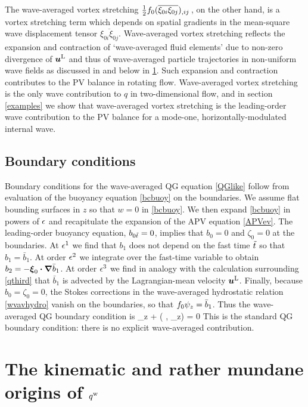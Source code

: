 \documentclass[12pt, oneside]{book}
\begin{document}
The wave-averaged vortex stretching $\half f_0  (\overline{\xi_{0i} \xi_{0j}}  )_{,ij} \, $, on the other hand, is a vortex stretching term which depends on spatial gradients in the mean-square wave displacement tensor $\overline{\xi_{0i} \xi_{0j} }$.  Wave-averaged vortex stretching reflects the expansion and contraction of `wave-averaged fluid elements' due to non-zero divergence of $\buL$ and thus of wave-averaged particle trajectories in non-uniform wave fields as discussed in \citet{McIntyre1988} and below in \ch \ref{waveAveragedKinematics}.  Such expansion and contraction contributes to the PV balance in rotating flow.  Wave-averaged vortex stretching is the only wave contribution to $q$ in two-dimensional flow, and in section \ref{examples} we show that wave-averaged vortex stretching is the leading-order wave contribution to the PV balance for a mode-one, horizontally-modulated internal wave.

\subsection{Boundary conditions}

Boundary conditions for the wave-averaged QG equation \eqref{QGlike} follow from evaluation of the buoyancy equation \eqref{bcbuoy} on the boundaries. We assume flat bounding surfaces in $z$ so that  $w=0$ in \eqref{bcbuoy}.
We then expand \eqref{bcbuoy} in powers of $\ep$ and recapitulate the expansion of the APV equation \eqref{APVev}.  The leading-order buoyancy equation, $b_{0\tt}=0$, implies that $b_0=0$ and $\zeta_0=0$ at the boundaries.  At $\ep^1$ we find that $b_1$ does not depend on the fast time $\tt$ so that $b_1=\bar b_1$.  At order $\ep^2$ we integrate over the fast-time variable to obtain $b_2 = - \bxi_0 \bcdot \grad \bar b_1$. At order $\ep^3$ we find in analogy with the calculation surrounding \eqref{qthird} that $\bar b_1$ is advected by the Lagrangian-mean velocity  $\buL$. Finally, because $b_0=\zeta_0=0$, the Stokes corrections in the wave-averaged hydrostatic relation  \eqref{wvavhydro} vanish on the boundaries, so that $f_0\psiL_z = \bar b_1$. Thus the wave-averaged QG boundary condition  is 
\beq
\psiL_{z\bt} + \sJ\big( \psiL, \psiL_{z}\big) = 0 \per
\label{QGlikeboundary}
\eeq
This is the standard QG boundary condition: there is no explicit wave-averaged contribution.

\section{The kinematic and rather mundane origins of $\qdag$}
\label{waveAveragedKinematics}
\end{document}
